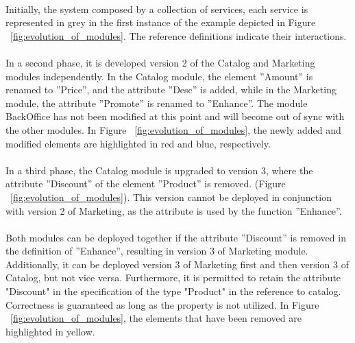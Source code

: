 \paragraph{}

Initially, the system composed by a collection of services,
each service is represented in grey in the first instance of the example depicted in Figure ~\ref{fig:evolution_of_modules}.
The reference definitions indicate their interactions.

\paragraph{}

In a second phase, it is developed version 2 of the Catalog and Marketing modules independently.
In the Catalog module, the element ''Amount'' is renamed to ''Price'', and the attribute ''Desc'' is added, while in the Marketing module,
the attribute ''Promote'' is renamed to ''Enhance''.
The module BackOffice has not been modified at this point and will become out of sync with the other modules.
In Figure ~\ref{fig:evolution_of_modules}, the newly added and modified elements are highlighted in red and blue, respectively.

\paragraph{}

In a third phase, the Catalog module is upgraded to version 3, where the attribute ''Discount'' of the element ''Product'' is removed.  (Figure ~\ref{fig:evolution_of_modules}).
This version cannot be deployed in conjunction with version 2 of Marketing, as the attribute is used by the function ''Enhance''.

\paragraph{}

Both modules can be deployed together if the attribute ''Discount'' is removed in the definition of ''Enhance'', resulting in version 3 of Marketing module.
Additionally, it can be deployed version 3 of Marketing first and then version 3 of Catalog, but not vice versa.
Furthermore, it is permitted to retain the attribute "Discount" in the specification of the type "Product" in the reference to catalog.
Correctness is guaranteed as long as the property is not utilized.
In Figure ~\ref{fig:evolution_of_modules}, the elements that have been removed are highlighted in yellow.

